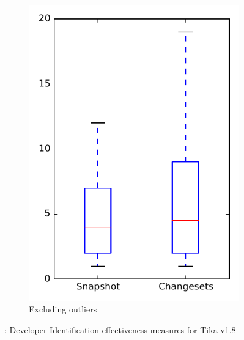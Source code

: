 \begin{figure}
\begin{subfigure}{.4\textwidth}
        \includegraphics[height=0.4\textheight]{figures/dit/rq1_tika_no_outlier}
        \caption{Excluding outliers}\label{fig:dit:rq1:tika_no_outlier}
    \end{subfigure}
\caption{\done: Developer Identification effectiveness measures for Tika v1.8}
\label{fig:dit:rq1:tika}
\end{figure}
